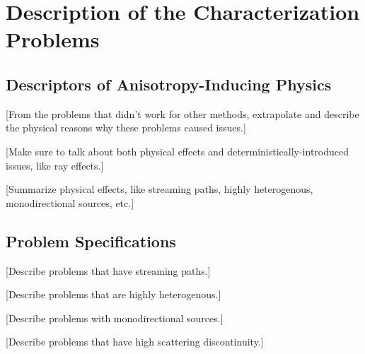 \section{Description of the Characterization Problems}
\label{sec:AngleProbDesc}

\subsection{Descriptors of Anisotropy-Inducing Physics}

[From the problems that didn't work for other methods, extrapolate and describe
the physical reasons why these problems caused issues.]

[Make sure to talk about both physical effects and deterministically-introduced
issues, like ray effects.]

[Summarize physical effects, like streaming paths, highly heterogenous,
monodirectional sources, etc.]

\subsection{Problem Specifications}

[Describe problems that have streaming paths.]

[Describe problems that are highly heterogenous.]

[Describe problems with monodirectional sources.]

[Describe problems that have high scattering discontinuity.]
